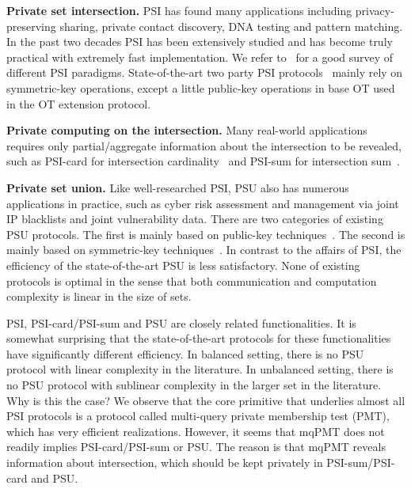 \documentclass[a4paper,10pt]{article}
\begin{document}
\begin{trivlist}
\item \textbf{Private set intersection.} PSI has found many applications including privacy-preserving sharing, 
    private contact discovery, DNA testing and pattern matching. 
    In the past two decades PSI has been extensively studied and 
    has become truly practical with extremely fast implementation.  
    We refer to~\cite{PSZ-ACM-2018} for a good survey of different PSI paradigms. 
    State-of-the-art two party PSI protocols~\cite{KKRT-CCS-2016, PRTY-CRYPTO-2019, CM-CRYPTO-2020, 
    GPRTY-CRYPTO-2021, RS-EUROCRYPT-2021} mainly rely on symmetric-key operations, 
    except a little public-key operations in base OT used in the OT extension protocol. 

\item \textbf{Private computing on the intersection.} Many real-world applications requires only 
    partial/aggregate information about the intersection to be revealed, 
    such as PSI-card for intersection cardinality~\cite{HFH-EC-1999} 
    and PSI-sum for intersection sum~\cite{Ion-EUROSP-2020, MPRSY-CRYPTO-2020}. 

\item \textbf{Private set union.} Like well-researched PSI, PSU also has numerous applications in practice, 
    such as cyber risk assessment and management via joint IP blacklists and joint vulnerability data. 
    There are two categories of existing PSU protocols. 
    The first is mainly based on public-key techniques~\cite{KS-CRYPTO-2005, Frikken-ACNS-2007, HN-PKC-2010, DC-ACISP-2017}. 
    The second is mainly based on symmetric-key techniques~\cite{KRTW-ASIACRYPT-2019, GMRSS-PKC-2021}.   
    In contrast to the affairs of PSI, the efficiency of the state-of-the-art PSU is less satisfactory. 
    None of existing protocols is optimal in the sense that both communication and computation complexity 
    is linear in the size of sets. 
\end{trivlist} 

PSI, PSI-card/PSI-sum and PSU are closely related functionalities. 
It is somewhat surprising that the state-of-the-art protocols for these functionalities have significantly different efficiency. 
In balanced setting, there is no PSU protocol with linear complexity in the literature.  
In unbalanced setting, there is no PSU protocol with sublinear complexity in the larger set in the literature.   
Why is this the case? We observe that the core primitive that underlies almost all PSI protocols 
is a protocol called multi-query private membership test (PMT), which has very efficient realizations. 
However, it seems that mqPMT does not readily implies PSI-card/PSI-sum or PSU. 
The reason is that mqPMT reveals information about intersection, which should be kept privately in PSI-sum/PSI-card and PSU. 
\end{document}
